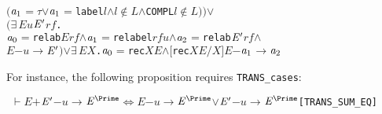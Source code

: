 \documentclass[GCNS]{yincog}
\renewcommand{\HOLConst}[1]{\texttt{#1}}
\renewcommand{\HOLBoundVar}[1]{\ensuremath{\mathit{#1}}}
\renewcommand{\HOLFreeVar}[1]{\ensuremath{\mathit{#1}}}
\renewcommand{\HOLSymConst}[1]{#1}
\renewcommand{\HOLTokenConj}{\ensuremath{\wedge}}
\renewcommand{\HOLTokenEquiv}{\ensuremath{\Longleftrightarrow}}
\renewcommand{\HOLTokenExists}{\ensuremath{\exists \,}}
\renewcommand{\HOLTokenNotIn}{\ensuremath{\notin}}
\renewcommand{\HOLTokenTurnstile}{\ensuremath{\:\:\vdash}}
\renewcommand{\HOLTokenDisj}{\ensuremath{\vee}}
\theoremstyle{remark}
\theoremstyle{theorem}
\theoremstyle{remark}
\newcommand{\HOLTokenTransBegin}{$-$}
\newcommand{\HOLTokenTransEnd}{$\rightarrow$\xspace}
\begin{document}
\begin{itemize}
\begin{alltt}
            \ensuremath{(}\ensuremath{\HOLBoundVar{a}\sb{\mathrm{1}}} \HOLSymConst{\ensuremath{=}} \HOLSymConst{\ensuremath{\tau}} \HOLSymConst{\HOLTokenDisj{}} \ensuremath{\HOLBoundVar{a}\sb{\mathrm{1}}} \HOLSymConst{\ensuremath{=}} \HOLConst{label} \HOLBoundVar{l} \HOLSymConst{\HOLTokenConj{}} \HOLBoundVar{l} \HOLSymConst{\HOLTokenNotIn{}} \HOLBoundVar{L} \HOLSymConst{\HOLTokenConj{}} \HOLConst{COMPL} \HOLBoundVar{l} \HOLSymConst{\HOLTokenNotIn{}} \HOLBoundVar{L}\ensuremath{)}\ensuremath{)} \HOLSymConst{\HOLTokenDisj{}}
       \ensuremath{(}\HOLSymConst{\HOLTokenExists{}}\HOLBoundVar{E} \HOLBoundVar{u} \ensuremath{\HOLBoundVar{E}\sp{\prime}} \HOLBoundVar{rf}.
            \ensuremath{\HOLBoundVar{a}\sb{\mathrm{0}}} \HOLSymConst{\ensuremath{=}} \HOLConst{relab} \HOLBoundVar{E} \HOLBoundVar{rf} \HOLSymConst{\HOLTokenConj{}} \ensuremath{\HOLBoundVar{a}\sb{\mathrm{1}}} \HOLSymConst{\ensuremath{=}} \HOLConst{relabel} \HOLBoundVar{rf} \HOLBoundVar{u} \HOLSymConst{\HOLTokenConj{}} \ensuremath{\HOLBoundVar{a}\sb{\mathrm{2}}} \HOLSymConst{\ensuremath{=}} \HOLConst{relab} \ensuremath{\HOLBoundVar{E}\sp{\prime}} \HOLBoundVar{rf} \HOLSymConst{\HOLTokenConj{}}
            \HOLBoundVar{E} \HOLTokenTransBegin\HOLBoundVar{u}\HOLTokenTransEnd \ensuremath{\HOLBoundVar{E}\sp{\prime}}\ensuremath{)} \HOLSymConst{\HOLTokenDisj{}} \HOLSymConst{\HOLTokenExists{}}\HOLBoundVar{E} \HOLBoundVar{X}. \ensuremath{\HOLBoundVar{a}\sb{\mathrm{0}}} \HOLSymConst{\ensuremath{=}} \HOLConst{rec} \HOLBoundVar{X} \HOLBoundVar{E} \HOLSymConst{\HOLTokenConj{}} \ensuremath{[}\HOLConst{rec} \HOLBoundVar{X} \HOLBoundVar{E}\ensuremath{/}\HOLBoundVar{X}\ensuremath{]} \HOLBoundVar{E} \HOLTokenTransBegin\ensuremath{\HOLBoundVar{a}\sb{\mathrm{1}}}\HOLTokenTransEnd \ensuremath{\HOLBoundVar{a}\sb{\mathrm{2}}}
\end{alltt}
%
For instance, the following proposition requires \texttt{TRANS\_cases}:
%
\begin{alltt}
\HOLTokenTurnstile{} \HOLFreeVar{E} \HOLSymConst{\ensuremath{+}} \ensuremath{\HOLFreeVar{E}\sp{\prime}} \HOLTokenTransBegin\HOLFreeVar{u}\HOLTokenTransEnd \ensuremath{\HOLFreeVar{E}\sp{\Prime}} \HOLSymConst{\HOLTokenEquiv{}} \HOLFreeVar{E} \HOLTokenTransBegin\HOLFreeVar{u}\HOLTokenTransEnd \ensuremath{\HOLFreeVar{E}\sp{\Prime}} \HOLSymConst{\HOLTokenDisj{}} \ensuremath{\HOLFreeVar{E}\sp{\prime}} \HOLTokenTransBegin\HOLFreeVar{u}\HOLTokenTransEnd \ensuremath{\HOLFreeVar{E}\sp{\Prime}}\hfill{[TRANS\_SUM\_EQ]}
\end{alltt}
%
\end{itemize}
\end{document}

